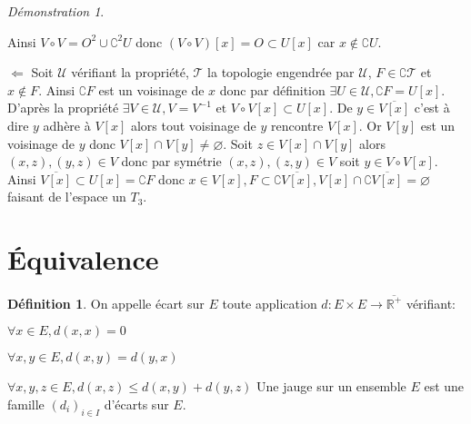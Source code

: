 \documentclass[a4paper, 11pt, french]{book}
\newenvironment{itemise}{\itemize}{\enditemize}
\theoremstyle{plain} %
\theoremstyle{definition} %
\newtheorem{definition}{Définition}
\theoremstyle{remark} %
\newtheorem*{demonstration}{Démonstration}
\newcommand{\1}{\mathds{1}}
\newcommand\vide{\varnothing}
\newcommand{\infegal}{\leqslant}
\newcommand{\inv}[1]{#1^{-1}}
\newcommand\et{\text{ et }}
\newcommand{\R}{\mathbb{R}}
\begin{document}
\begin{demonstration}
\begin{itemise}
\begin{center}
		\end{center}
		Ainsi $V\circ V=O^2\cup\complement^2 U$ donc $(V\circ V)[x]=O\subset U[x]$ car $x\notin\complement U$.
		\item[$\Leftarrow$] Soit $\mathscr{U}$ vérifiant la propriété, $\mathscr{T}$ la topologie engendrée par $\mathscr{U}$, $F\in\complement\mathscr{T}$ et $x\notin F$.
		Ainsi $\complement F$ est un voisinage de $x$ donc par définition $\exists U\in\mathscr{U}, \complement F=U[x]$.
		D'après la propriété $\exists V\in\mathscr{U}, V=\inv{V}\et V\circ V[x]\subset U[x]$.
		De $y\in\overline{V[x]}$ c'est à dire $y$ adhère à $V[x]$ alors tout voisinage de $y$ rencontre $V[x]$.
		Or $V[y]$ est un voisinage de $y$ donc $V[x]\cap V[y]\neq\vide$.
		Soit $z\in V[x]\cap V[y]$ alors $(x, z), (y, z)\in V$ donc par symétrie $(x, z), (z, y)\in V$ soit $y\in V\circ V[x]$.
		Ainsi $\overline{V[x]}\subset U[x]=\complement F$ donc $x\in V[x], F\subset\complement\overline{V[x]}, V[x]\cap\complement\overline{V[x]}=\vide$ faisant de l'espace un $T_3$.
	\end{itemise}
\end{demonstration}

\section{Équivalence}

\begin{definition}
	On appelle écart sur $E$ toute application $d:E\times E\rightarrow\overline{\R^+}$ vérifiant:
	\begin{itemise}
		\item $\forall x\in E, d(x, x)=0$
		\item $\forall x, y\in E, d(x, y)=d(y, x)$
		\item $\forall x, y, z\in E, d(x, z)\infegal d(x, y)+d(y, z)$
	\end{itemise}
	Une jauge sur un ensemble $E$ est une famille $(d_i)_{i\in I}$ d'écarts sur $E$.
\end{definition}
\end{document}

